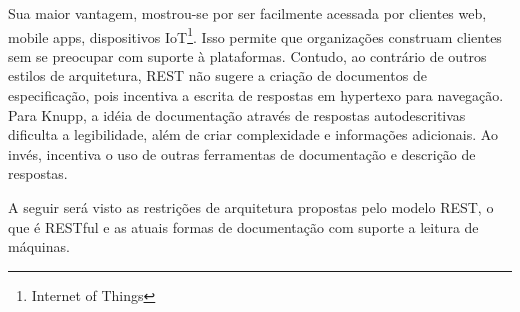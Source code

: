 Sua maior vantagem, mostrou-se por ser facilmente acessada por clientes web, mobile apps, dispositivos IoT\footnote{
  Internet of Things
}. Isso permite que organizações construam clientes sem se preocupar com suporte à plataformas. Contudo, ao contrário de outros estilos de arquitetura, REST não sugere a criação de documentos de especificação, pois incentiva a escrita de respostas em hypertexo para navegação. Para Knupp, a idéia de documentação através de respostas autodescritivas dificulta a legibilidade, além de criar complexidade e informações adicionais. Ao invés, incentiva o uso de outras ferramentas de documentação e descrição de respostas. \cite{Knupp2016}

A seguir será visto as restrições de arquitetura propostas pelo modelo REST, o que é RESTful e as atuais formas de documentação com suporte a leitura de máquinas.




